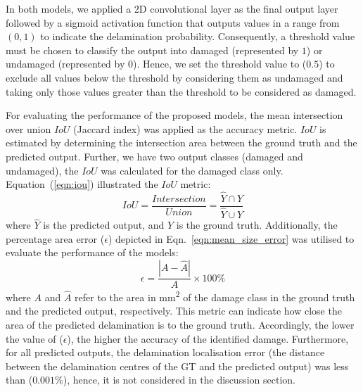 In both models, we applied a 2D convolutional layer as the final output layer followed by a sigmoid activation function that outputs values in a range from \((0,1)\) to indicate the delamination probability.
Consequently, a threshold value must be chosen to classify the output into damaged (represented by \(1\)) or undamaged (represented by \(0\)).
Hence, we set the threshold value to (\(0.5\)) to exclude all values below the threshold by considering them as undamaged and taking only those values greater than the threshold to be considered as damaged.

For evaluating the performance of the proposed models, the mean 
intersection over union \(IoU\) (Jaccard index) was applied as the accuracy metric. 
\(IoU\) is estimated by determining the intersection
area between the ground truth and the predicted output. 
Further, we have two output classes (damaged and undamaged), the \(IoU\) was calculated for the damaged class only. 
Equation~(\ref{eqn:iou}) illustrated the \(IoU\) metric: 
\begin{equation}
	IoU=\frac{Intersection}{Union}=\frac{\hat{Y} \cap Y}{\hat{Y} \cup Y}
	\label{eqn:iou}
\end{equation}
where \(\hat{Y}\) is the predicted output, and \(Y\) is the ground truth.
Additionally, the percentage area error ($\epsilon$) depicted in Eqn.~\ref{eqn:mean_size_error} was utilised to evaluate the performance of the models:
\begin{equation}
	\epsilon=\frac{|A-\hat{A}|}{A} \times 100\%
	\label{eqn:mean_size_error}
\end{equation}
where \(A\) and \(\hat{A}\) refer to the area in mm\textsuperscript{2} of the damage class in the ground truth and the predicted output, respectively.
This metric can indicate how close the area of the predicted delamination is to the ground truth.
Accordingly, the lower the value of ($\epsilon$), the higher the accuracy of the identified damage. 
Furthermore, for all predicted outputs, the delamination localisation error (the distance between the delamination centres of the GT and the predicted output) was less than (\(0.001\%\)), hence, it is not considered in the discussion section.